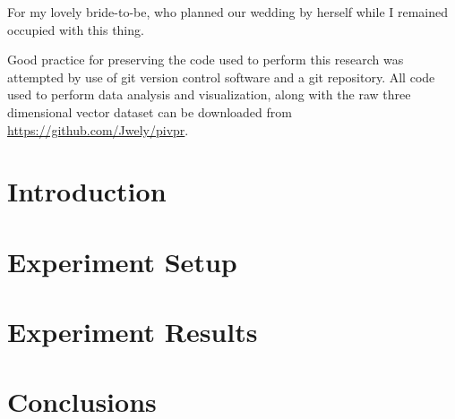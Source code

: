 \documentclass[12pt]{report}	%
\begin{document}
\beforepreface

For my lovely bride-to-be, who planned our wedding by herself while I remained 
occupied with this thing.

Good practice for preserving the code used to perform this research was 
attempted by use of git version control software and a git repository. All code 
used to perform data analysis and visualization, along with the raw three 
dimensional vector dataset can be downloaded from 
\url{https://github.com/Jwely/pivpr}.
%
\fi

\afterpreface
\iftrue		%
\chapter{Introduction}



\fi
\iftrue		%
\chapter{Experiment Setup}







\fi
\iftrue		%
\chapter{Experiment Results}


\fi
\iftrue		%
\chapter{Conclusions}

\fi


\end{document}
